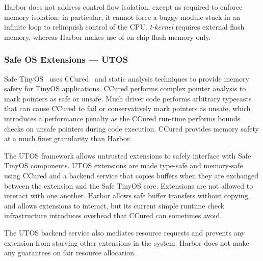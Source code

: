 Harbor does not address control flow isolation, except as required to
enforce memory isolation; in particular, it cannot force a buggy module
stuck in an infinite loop to relinquish control of the CPU.
%
\emph{t-kernel} requires external flash memory, whereas Harbor makes use of
on-chip flash memory only.
%
\subsubsection{Safe OS Extensions --- UTOS}
%
Safe TinyOS~\cite{regehr06utos} uses CCured~\cite{ccured02necula} and static
analysis techniques to provide memory safety for TinyOS applications.
%
CCured performs complex pointer analysis to mark pointers as safe or
unsafe.
%
Much driver code performs arbitrary typecasts that can cause CCured to
fail or conservatively mark pointers as unsafe, which introduces a
performance penalty as the CCured run-time performs bounds checks on
unsafe pointers during code execution.
%
CCured provides memory safety at a much finer granularity than Harbor.
%

The UTOS framework allows untrusted extensions to
safely interface with Safe TinyOS components.
%
UTOS extensions are made type-safe and memory-safe using CCured and a
backend service that copies buffers when they are exchanged between the
extension and the Safe TinyOS core.
%
Extensions are not allowed to interact with one another.
%
Harbor allows safe buffer transfers without copying, and allows extensions
to interact, but its current simple runtime check infrastructure introduces
overhead that CCured can sometimes avoid.
%

The UTOS backend service also mediates resource requests and prevents any
extension from starving other extensions in the system.
%
Harbor does not make any guarantees on fair resource allocation.
%
